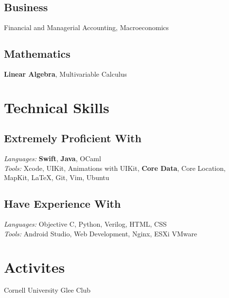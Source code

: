 \documentclass[]{deedy-resume-openfont}
\let\sectionold\section
\renewcommand{\section}[1]{
	\sectionold{\textcolor{sectiontitlecolor}{#1}}
}
\begin{document}
\begin{minipage}[t]{0.33\textwidth}
\subsection{Business}
Financial and Managerial Accounting, Macroeconomics
\sectionsep

\subsection{Mathematics}
\textbf{Linear Algebra}, Multivariable Calculus

\sectionsep


\section{Technical Skills}
\subsection{Extremely Proficient With}
\textit{Languages:} \textbf{Swift}, \textbf{Java}, OCaml \\
\textit{Tools:} Xcode, UIKit, Animations with UIKit, \textbf{Core Data}, Core Location, MapKit, \LaTeX{}, Git, Vim, Ubuntu
\sectionsep
\subsection{Have Experience With}
\textit{Languages:} Objective C, Python, Verilog, HTML, CSS \\
\textit{Tools:} Android Studio, Web Development, Nginx, ESXi VMware
\sectionsep

\section{Activites}
\vspace{\topsep} %
\begin{tightemize}
\item Cornell University Glee Club
\end{tightemize}

%
%

\end{minipage} 
\hfill
\end{document}
